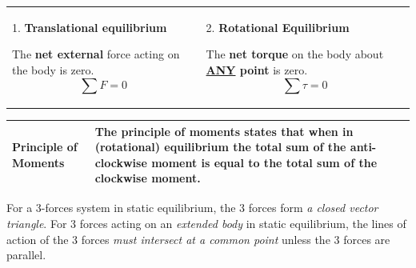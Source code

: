 \documentclass[a4paper,11pt]{article}
\begin{document}
			\begin{tabular}{@{} C{0.48\textwidth} C{0.48\textwidth}  @{}}
				1. \textbf{Translational equilibrium} \par The \textbf{net external} force acting on the body is zero. $$\sum F = 0$$ & 2. \textbf{Rotational Equilibrium} \par The \textbf{net torque} on the body about \textbf{\underline{ANY} point} is zero. $$\sum \tau = 0$$ \vspace*{-\baselineskip} \\
			\end{tabular}
			\vspace{-\baselineskip}
			\begin{center}
				\renewcommand{\arraystretch}{1.2}
				\begin{tabular}{@{} l p{10.8cm} @{}}
					\toprule
					Principle of Moments & The principle of moments states that when in (rotational) equilibrium the total sum of the anti-clockwise moment is equal to the total sum of the clockwise moment. \\
					\bottomrule
				\end{tabular}
			\end{center}
			
			For a 3-forces system in static equilibrium, the 3 forces form \textit{a closed vector triangle}. For 3 forces acting on an \textit{extended body} in static equilibrium, the lines of action of the 3 forces \textit{must intersect at a common point} unless the 3 forces are parallel.
\end{document}
